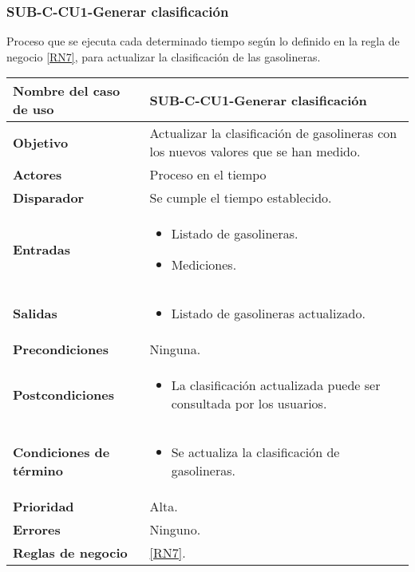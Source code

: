 \subsubsection{SUB-C-CU1-Generar clasificación}\label{SUB-C-CU1}
Proceso que se ejecuta cada determinado tiempo según lo definido en la regla de negocio \ref{RN7}, para actualizar la clasificación de las gasolineras.

\begin{longtable}{|J{5cm}|J{10.3cm}|}
	\hline
	\textbf{Nombre del caso de uso} &
		SUB-C-CU1-Generar clasificación \\ \hline
	\textbf{Objetivo} &
		Actualizar la clasificación de gasolineras con los nuevos valores que se han medido. \\ \hline
	\textbf{Actores} &
		Proceso en el tiempo \\ \hline 
	\textbf{Disparador} & 
		Se cumple el tiempo establecido. \\ \hline 
	\textbf{Entradas} & 
		\begin{itemize}
				\item Listado de gasolineras.
				\item Mediciones.
		\end{itemize}\\ \hline 
	\textbf{Salidas} & 
		\begin{itemize}
			\item Listado de gasolineras actualizado.
		\end{itemize} \\ \hline
	\textbf{Precondiciones} &
		Ninguna.\\ \hline
	\textbf{Postcondiciones} &
		\begin{itemize}
			\item La clasificación actualizada puede ser consultada por los usuarios.
		\end{itemize} \\ \hline
	\textbf{Condiciones de término} & 
		\begin{itemize}
			\item Se actualiza la clasificación de gasolineras.
		\end{itemize} \\ \hline 
	\textbf{Prioridad} & 
		Alta. \\ \hline
	\textbf{Errores} & Ninguno.
		\\ \hline
	\textbf{Reglas de negocio} & \ref{RN7}.
		 \\ \hline
\end{longtable}

